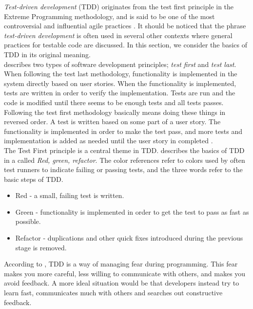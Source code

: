 \emph{Test-driven development} (TDD) originates from the test first
principle in the Extreme Programming methodology, and is said to be one
of the most controversial and influential agile practices
\cite{book:tdd_madeyski}. It should be noticed that the phrase
\emph{test-driven development} is often used in several other contexts
where general practices for testable code are discussed. In this
section, we consider the basics of TDD in its original meaning.\\

\citet{book:tdd_madeyski} describes two types of software development
principles; \emph{test first} and \emph{test last}. When following the
test last methodology, functionality is implemented in the system
directly based on user stories. When the functionality is implemented,
tests are written in order to verify the implementation. Tests are run
and the code is modified until there seems to be enough tests and all
tests passes.\\

Following the test first methodology basically means doing these things
in reversed order. A test is written based on some part of a user story.
The functionality is implemented in order to make the test pass, and
more tests and implementation is added as needed until the user story in
completed \cite{book:tdd_madeyski}.\\

The Test First principle is a central theme in TDD.
\citet{book:tdd_beck} describes the basics of TDD in a 
called \emph{Red, green, refactor}. The color references refer to colors
used by often test runners to indicate failing or passing tests, and the
three words refer to the basic steps of TDD.

\begin{itemize}
    \item Red - a small, failing test is written.
    \item Green - functionality is implemented in order to get the test
          to pass as fast as possible.
    \item Refactor - duplications and other quick fixes introduced
          during the previous stage is removed.
\end{itemize}

According to \citeauthor{book:tdd_beck}, TDD is a way of managing fear
during programming. This fear makes you more careful, less willing to
communicate with others, and makes you avoid feedback. A more ideal
situation would be that developers instead try to learn fast,
communicates much with others and searches out constructive feedback.\\

